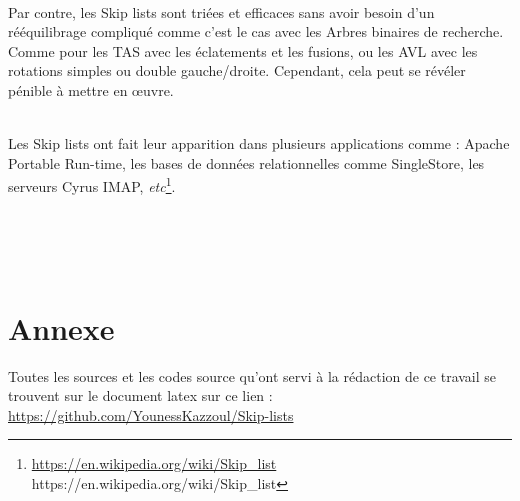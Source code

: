 \documentclass[hidelinks,a4paper,12pt]{article}
\begin{document}
~\\
Par contre, les Skip lists sont triées et efficaces sans avoir besoin d’un rééquilibrage compliqué comme c’est le cas avec les Arbres binaires de recherche. Comme pour les TAS avec les éclatements et les fusions, ou les AVL avec les rotations simples ou double gauche/droite. Cependant, cela peut se révéler pénible à mettre en œuvre.

~\\
Les Skip lists ont fait leur apparition dans plusieurs applications comme : Apache Portable Run-time, les bases de données relationnelles comme SingleStore, les serveurs Cyrus IMAP, \textit{etc}\footnote[5]{ \url{https://en.wikipedia.org/wiki/Skip\_list} {https://en.wikipedia.org/wiki/Skip\_list} }.


~\\~\\~\\
\section{Annexe}
Toutes les sources et les codes source qu'ont servi à la rédaction de ce travail se trouvent sur le document latex sur ce lien :
\href{https://github.com/YounessKazzoul/Skip-lists}{https://github.com/YounessKazzoul/Skip-lists} 




\nocite{ArticleDemaine} \nocite{ArticleHamel} \nocite{ArticleSchwar} 
\nocite{NoteCours} \nocite{ArticlePugh} \nocite{ArticleZeratti}
\nocite{InegaliteDeBoole} 
\nocite{ArticleDan} \nocite{WEBSITE:2}

\newpage










	
	
\end{document}
